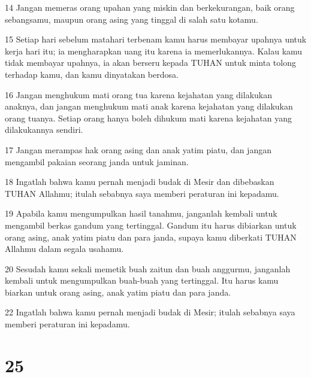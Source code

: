 \par 14 Jangan memeras orang upahan yang miskin dan berkekurangan, baik orang sebangsamu, maupun orang asing yang tinggal di salah satu kotamu.
\par 15 Setiap hari sebelum matahari terbenam kamu harus membayar upahnya untuk kerja hari itu; ia mengharapkan uang itu karena ia memerlukannya. Kalau kamu tidak membayar upahnya, ia akan berseru kepada TUHAN untuk minta tolong terhadap kamu, dan kamu dinyatakan berdosa.
\par 16 Jangan menghukum mati orang tua karena kejahatan yang dilakukan anaknya, dan jangan menghukum mati anak karena kejahatan yang dilakukan orang tuanya. Setiap orang hanya boleh dihukum mati karena kejahatan yang dilakukannya sendiri.
\par 17 Jangan merampas hak orang asing dan anak yatim piatu, dan jangan mengambil pakaian seorang janda untuk jaminan.
\par 18 Ingatlah bahwa kamu pernah menjadi budak di Mesir dan dibebaskan TUHAN Allahmu; itulah sebabnya saya memberi peraturan ini kepadamu.
\par 19 Apabila kamu mengumpulkan hasil tanahmu, janganlah kembali untuk mengambil berkas gandum yang tertinggal. Gandum itu harus dibiarkan untuk orang asing, anak yatim piatu dan para janda, supaya kamu diberkati TUHAN Allahmu dalam segala usahamu.
\par 20 Sesudah kamu sekali memetik buah zaitun dan buah anggurmu, janganlah kembali untuk mengumpulkan buah-buah yang tertinggal. Itu harus kamu biarkan untuk orang asing, anak yatim piatu dan para janda.
\par 22 Ingatlah bahwa kamu pernah menjadi budak di Mesir; itulah sebabnya saya memberi peraturan ini kepadamu.

\chapter{25}

